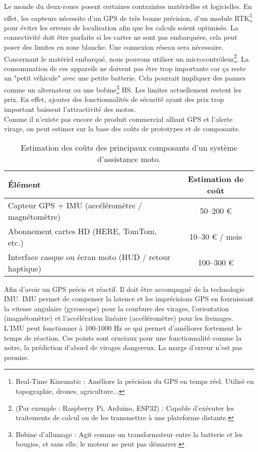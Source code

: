 Le monde du deux-roues posent certaines contraintes matérielles et logicielles. En effet, les capteurs nécessite d’un GPS de très bonne précision, d'un module RTK\footnote{Real-Time Kinematic : Améliore la précision du GPS en temps réel. Utilisé en topographie, drones, agriculture...} pour éviter les erreurs de localisation afin que les calculs soient optimisés. La connectivité doit être parfaite si les cartes ne sont pas embarquées, cela peut poser des limites en zone blanche. Une connexion réseau sera nécessaire. Concernant le matériel embarqué, nous pouvons utiliser un  microcontrôleur\footnote{ (Par exemple : Raspberry Pi, Arduino, ESP32) : Capable d’exécuter les traitements de calcul ou de les transmettre à une plateforme distante.}. La consommation de ces appareils ne doivent pas être trop importante car ça reste un "petit véhicule" avec une petite batterie. Cela pourrait impliquer des pannes comme un alternateur ou une bobine\footnote{Bobine d’allumage : Agit comme un transformateur entre la batterie et les bougies, et sans elle, le moteur ne peut pas démarrer.} HS.
Les limites actuellement restent les prix. En effet, ajouter des fonctionnalités de sécurité ayant des prix trop important baissent l'attractivité des motos. \\
Comme il n’existe pas encore de produit commercial alliant GPS et l'alerte virage, on peut estimer sur la base des coûts de prototypes et de composants.

\begin{table}[h!]
\centering
\begin{tabular}{|p{7cm}|c|}
\hline
\textbf{Élément} & \textbf{Estimation de coût} \\
\hline
Capteur GPS + IMU (accéléromètre / magnétomètre) & 50–200 € \\
Abonnement cartes HD (HERE, TomTom, etc.) & 10–30 € / mois \\
Interface casque ou écran moto (HUD / retour haptique) & 100–300 € \\
\hline
\end{tabular}
\caption{Estimation des coûts des principaux composants d'un système d’assistance moto.}
\label{tab:couts-composants}
\end{table}
Afin d'avoir un GPS précis et réactif. Il doit être accompagné de la technologie IMU. IMU permet de compenser la latence et les imprécisions GPS en fournissant la vitesse angulaire (gyroscope) pour la courbure des virages, l'orientation (magnétomètre) et l'accélération linéaire (accéléromètre) pour les freinages. L'IMU peut fonctionner à 100-1000 Hz ce qui permet d'améliorer fortement le temps de réaction. Ces points sont cruciaux pour une fonctionnalité comme la notre, la prédiction d'abord de virages dangereux. La marge d'erreur n'est pas permise.

